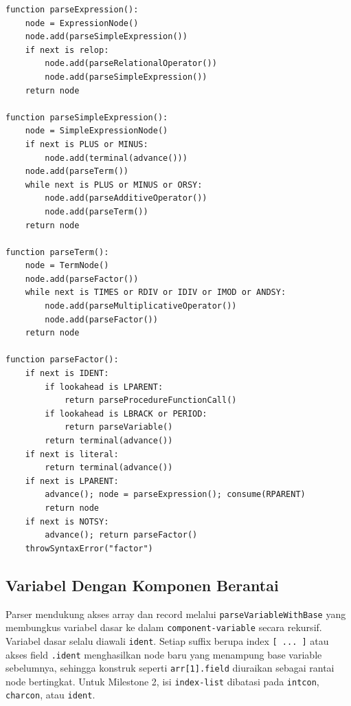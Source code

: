 \begin{tcolorbox}[title=Pseudocode hierarki ekspresi,colback=gray!5,colframe=black!60,boxrule=0.5pt,arc=2mm,breakable]
\begin{verbatim}
function parseExpression():
    node = ExpressionNode()
    node.add(parseSimpleExpression())
    if next is relop:
        node.add(parseRelationalOperator())
        node.add(parseSimpleExpression())
    return node

function parseSimpleExpression():
    node = SimpleExpressionNode()
    if next is PLUS or MINUS:
        node.add(terminal(advance()))
    node.add(parseTerm())
    while next is PLUS or MINUS or ORSY:
        node.add(parseAdditiveOperator())
        node.add(parseTerm())
    return node

function parseTerm():
    node = TermNode()
    node.add(parseFactor())
    while next is TIMES or RDIV or IDIV or IMOD or ANDSY:
        node.add(parseMultiplicativeOperator())
        node.add(parseFactor())
    return node

function parseFactor():
    if next is IDENT:
        if lookahead is LPARENT:
            return parseProcedureFunctionCall()
        if lookahead is LBRACK or PERIOD:
            return parseVariable()
        return terminal(advance())
    if next is literal:
        return terminal(advance())
    if next is LPARENT:
        advance(); node = parseExpression(); consume(RPARENT)
		return node
    if next is NOTSY:
        advance(); return parseFactor()
    throwSyntaxError("factor")
\end{verbatim}
\end{tcolorbox}

\subsection{Variabel Dengan Komponen Berantai}
Parser mendukung akses array dan record melalui \texttt{parseVariableWithBase} yang membungkus variabel dasar ke dalam \texttt{component-variable} secara rekursif. Variabel dasar selalu diawali \texttt{ident}. Setiap suffix berupa index \texttt{[ ... ]} atau akses field \texttt{.ident} menghasilkan node baru yang menampung base variable sebelumnya, sehingga konstruk seperti \texttt{arr[1].field} diuraikan sebagai rantai node bertingkat. Untuk Milestone 2, isi \texttt{index-list} dibatasi pada \texttt{intcon}, \texttt{charcon}, atau \texttt{ident}.

